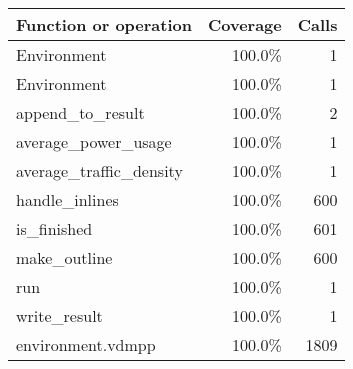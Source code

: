 \documentclass[a4paper]{article}
\begin{document}
\bigskip
\begin{longtable}{|l|r|r|}
\hline
Function or operation & Coverage & Calls \\
\hline
\hline
Environment & 100.0\% & 1 \\
\hline
Environment & 100.0\% & 1 \\
\hline
append\_to\_result & 100.0\% & 2 \\
\hline
average\_power\_usage & 100.0\% & 1 \\
\hline
average\_traffic\_density & 100.0\% & 1 \\
\hline
handle\_inlines & 100.0\% & 600 \\
\hline
is\_finished & 100.0\% & 601 \\
\hline
make\_outline & 100.0\% & 600 \\
\hline
run & 100.0\% & 1 \\
\hline
write\_result & 100.0\% & 1 \\
\hline
\hline
environment.vdmpp & 100.0\% & 1809 \\
\hline
\end{longtable}
\end{document}
